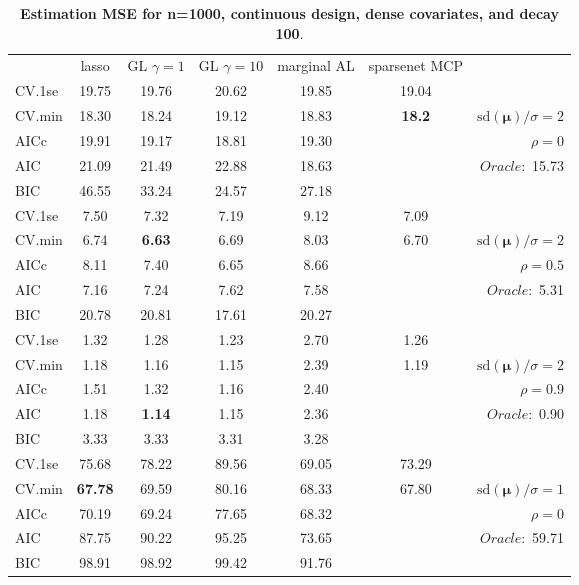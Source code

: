 \clearpage
\begin{table}\vspace{-.5cm}
\caption[l]{ { \bf Estimation MSE for n=1000, continuous design, 
dense covariates, and  decay  100}.}
\vspace{-.5cm}
\footnotesize{}
\begin{center}
\begin{tabular}{l*{5}{c}|r}
& lasso & GL $\gamma=1$ & GL $\gamma=10$ & marginal AL & sparsenet MCP  & \\
 \cline{1-7}
CV.1se & 19.75 & 19.76 & 20.62 & 19.85 & 19.04 & \\
CV.min & 18.30 & 18.24 & 19.12 & 18.83 & {\bf 18.2} &  $\mathrm{sd}(\mathbf{\mu})/\sigma=2$ \\
AICc & 19.91 & 19.17 & 18.81 & 19.30 & & $\rho=0$ \\
AIC & 21.09 & 21.49 & 22.88 & 18.63 & &  \multirow{2}{*}{$Oracle: $ 15.73} \\
BIC & 46.55 & 33.24 & 24.57 & 27.18 & &  \\
 \hline 
CV.1se & 7.50 & 7.32 & 7.19 & 9.12 & 7.09 & \\
CV.min & 6.74 & {\bf 6.63} & 6.69 & 8.03 & 6.70 &  $\mathrm{sd}(\mathbf{\mu})/\sigma=2$ \\
AICc & 8.11 & 7.40 & 6.65 & 8.66 & & $\rho=0.5$ \\
AIC & 7.16 & 7.24 & 7.62 & 7.58 & &  \multirow{2}{*}{$Oracle: $ 5.31} \\
BIC & 20.78 & 20.81 & 17.61 & 20.27 & &  \\
 \hline 
CV.1se & 1.32 & 1.28 & 1.23 & 2.70 & 1.26 & \\
CV.min & 1.18 & 1.16 & 1.15 & 2.39 & 1.19 &  $\mathrm{sd}(\mathbf{\mu})/\sigma=2$ \\
AICc & 1.51 & 1.32 & 1.16 & 2.40 & & $\rho=0.9$ \\
AIC & 1.18 & {\bf 1.14} & 1.15 & 2.36 & &  \multirow{2}{*}{$Oracle: $ 0.90} \\
BIC & 3.33 & 3.33 & 3.31 & 3.28 & &  \\
 \hline 
CV.1se & 75.68 & 78.22 & 89.56 & 69.05 & 73.29 & \\
CV.min & {\bf 67.78} & 69.59 & 80.16 & 68.33 & 67.80 &  $\mathrm{sd}(\mathbf{\mu})/\sigma=1$ \\
AICc & 70.19 & 69.24 & 77.65 & 68.32 & & $\rho=0$ \\
AIC & 87.75 & 90.22 & 95.25 & 73.65 & &  \multirow{2}{*}{$Oracle: $ 59.71} \\
BIC & 98.91 & 98.92 & 99.42 & 91.76 & &  \\

\end{tabular}
\end{center}
\end{table}
